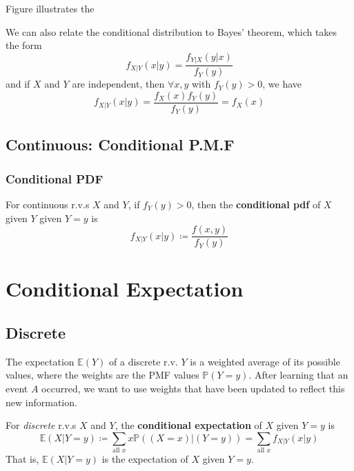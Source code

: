 \documentclass{article}
\begin{document}
\noindent Figure illustrates the 


\noindent We can also relate the conditional distribution to Bayes' theorem, which takes the form \begin{equation*}
    f_{X | Y} (x|y) = \frac{f_{Y | X}(y|x)}{f_Y (y)}
\end{equation*} and if $X$ and $Y$ are independent, then $\forall x, y$ with $f_Y (y) > 0$, we have \begin{equation*}
    f_{X|Y}(x|y) = \frac{f_X(x)f_Y(y)}{f_Y(y)} = f_X (x)
\end{equation*}


\subsection{Continuous: Conditional P.M.F}

\subsubsection{Conditional PDF}

\begin{definition}
    
    For continuous r.v.s $X$ and $Y$, if $f_Y (y) > 0$, then the \textbf{conditional pdf} of $X$ given $Y$ given $Y = y$ is \begin{equation}
        f_{X | Y}(x|y) \coloneq \frac{f(x,y)}{f_Y(y)}
    \end{equation} 
\end{definition}


\section{Conditional Expectation}

\subsection{Discrete}

The expectation $\mathbb{E}(Y)$ of a discrete r.v. $Y$ is a weighted average of its possible values, where the weights are the PMF values $\mathbb{P}(Y = y)$. After learning that an event $A$ occurred, we want to use weights that have been updated to reflect this new information. 

\begin{definition}
    For \textit{discrete} r.v.s $X$ and $Y$, the \textbf{conditional expectation} of $X$ given $Y = y$ is \begin{equation}
        \mathbb{E}(X | Y = y) \coloneq \sum_{\text{all } x} x \mathbb{P}((X = x) | (Y = y)) = \sum_{\text{all }x }f_{X | Y} (x|y)  
    \end{equation} That is, $\mathbb{E}(X | Y = y)$ is the expectation of $X$ given $Y = y$. 
\end{definition}
\end{document}

